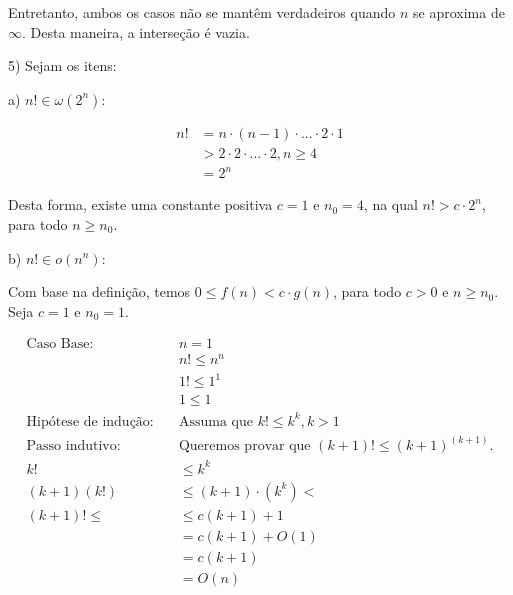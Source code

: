 \documentclass[]{article}
\begin{document}
Entretanto, ambos os casos não se mantêm verdadeiros quando $n$ se aproxima de $\infty$. Desta maneira, a interseção é vazia.

\vspace{1cm}

5) Sejam os itens:

a) $n! \in \omega(2^n)$:

\begin{align*}
    n! & = n \cdot (n-1) \cdot ... \cdot 2 \cdot 1 \\
       & > 2 \cdot 2 \cdot ... \cdot 2, n \geq 4 \\
       & = 2^n
\end{align*}

Desta forma, existe uma constante positiva $c=1$ e $n_0=4$, na qual $n! > c \cdot 2^n$, para todo $n \geq n_0$.

\vspace{0.5cm}

b) $n! \in o(n^n)$:






Com base na definição, temos $0 \leq f(n) < c \cdot g(n)$, para todo $c>0$ e $n \geq n_0$. Seja $c=1$ e $n_0=1$.

\begin{align*}
    \text{Caso Base}: \quad & n = 1 \\
                      \quad & n! \leq n^n \\
                      \quad & 1! \leq 1^1 \\
                      \quad & 1 \leq 1 \\
    \text{Hipótese de indução:} \quad & \text{Assuma que } k! \leq k^k, k>1 \\
    \text{Passo indutivo:} \quad & \text{Queremos provar que } (k+1)! \leq (k+1)^{(k+1)}. \\
                              k! & \leq k^k \\
                       (k+1)(k!) & \leq (k+1) \cdot (k^k) < \\
                       (k+1)! \leq 
                                   & \leq c(k+1) + 1 \\
                                   & = c(k+1) + O(1) \\
                                   & = c(k+1) \\
                                   & = O(n)
\end{align*}
\end{document}
